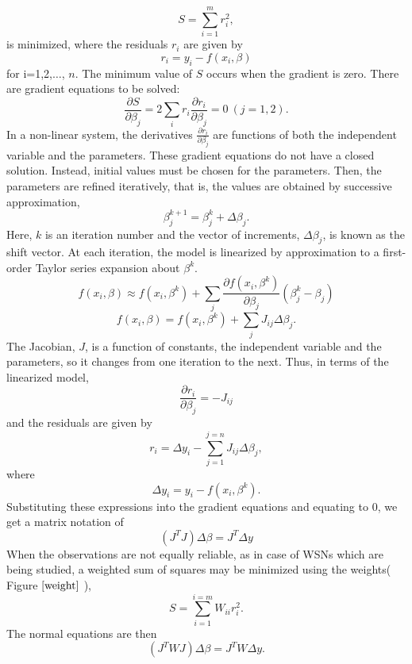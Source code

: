 \documentclass[a4paper,10pt]{report}
\begin{document}
\begin{equation}
    S=\sum_{i=1}^{m}r_i^2 ,
\end{equation}
is minimized, where the residuals $r_i$ are given by
\begin{equation}
    r_i = y_i - f(x_i,\beta)
\end{equation}
for i=1,2,$\dots$, $n$.
\newline
The minimum value of $S$ occurs when the gradient is zero. There are gradient equations to be solved:
\begin{equation}
    \frac{\partial S}{\partial \beta_j}=2\sum_i r_i\frac{\partial r_i}{\partial \beta_j}=0 \ (j=1,2).
\end{equation}
In a non-linear system, the derivatives $\frac{\partial r_i}{\partial \beta_j}$ are functions of both the independent variable and the parameters. These gradient equations do not have a closed solution. Instead, initial values must be chosen for the parameters. Then, the parameters are refined iteratively, that is, the values are obtained by successive approximation,
\begin{equation}
    \beta_j^{k+1}=\beta^k_j+\Delta \beta_j.
\end{equation}
Here, $k$ is an iteration number and the vector of increments, $\Delta \beta_j$, is known as the shift vector. At each iteration,
the model is linearized by approximation to a first-order Taylor series expansion about $\beta^k$.
\begin{equation}
    f(x_i,\beta)\approx f(x_i,\beta^k) +\sum_j \frac{\partial f(x_i, \beta^k)}{\partial \beta_j} \left(\beta^k_j -\beta_j \right)
\end{equation}
\begin{equation}
 f(x_i,\beta) =f(x_i, \beta^k)+\sum_j J_{ij} \Delta\beta_j.
\end{equation}
The Jacobian, $J$, is a function of constants, the independent variable and the parameters, so it changes from one iteration to the
next. Thus, in terms of the linearized model,
\begin{equation}
\frac{\partial r_i}{\partial \beta_j}=-J_{ij}
\end{equation}
and the residuals are given by
\begin{equation}
    r_i=\Delta y_i- \sum_{j=1}^{j=n} J_{ij}\Delta\beta_j,
\end{equation}
where
\begin{equation}
 \Delta y_i=y_i- f(x_i, \beta^k).
\end{equation}
Substituting these expressions into the gradient equations and equating to $0$, we get a matrix notation of
\begin{equation}
    \left(J^TJ\right)\Delta  \beta=J^T\Delta y
\end{equation}
When the observations are not equally reliable, as in case of WSNs which are being studied, a weighted sum of squares may be minimized
using the weights( Figure $\ref{weight}$ ),
\begin{equation}
    S=\sum_{i=1}^{i=m}W_{ii}r_i^2.
\end{equation}
The normal equations are then
\begin{equation}
    \left(J^TWJ\right)\Delta  \beta=J^TW\Delta y.
\end{equation}
\end{document}
